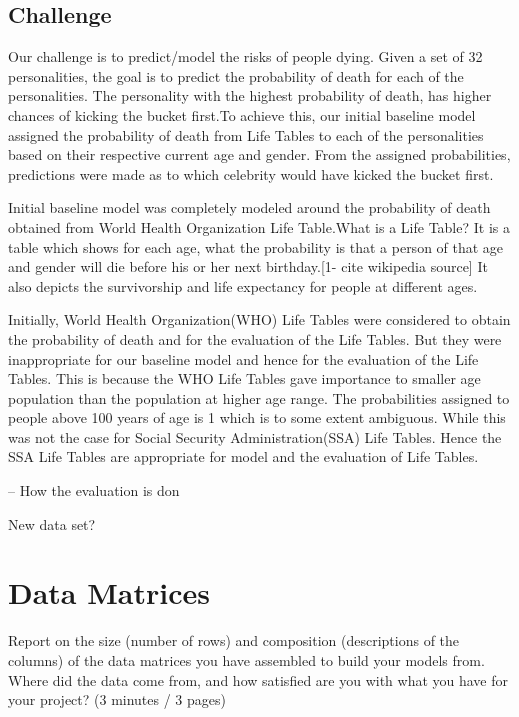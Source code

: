 \documentclass[runningheads]{llncs}
\begin{document}
\subsection{Challenge}

Our challenge is to predict/model the risks of people dying. Given a set of 32 personalities, the goal is to predict the probability of death for each of the personalities. The personality with the highest probability of death, has higher chances of kicking the bucket first.To achieve this, our initial baseline model assigned the probability of death from Life Tables to each of the personalities based on their respective current age and gender. From the assigned probabilities, predictions were made as to which celebrity would have kicked the bucket first.

Initial baseline model was completely modeled around the probability of death obtained from World Health Organization Life Table.What is a Life Table? It is a table which shows for each age, what the probability is that a person of that age and gender will die before his or her next birthday.[1- cite wikipedia source] It also depicts the survivorship and life expectancy for people at different ages.


Initially, World Health Organization(WHO) Life Tables were considered to obtain the probability of death and for the evaluation of the Life Tables. But they were inappropriate for our baseline model and hence for the evaluation of the Life Tables. This is because the WHO Life Tables gave importance to smaller age population than the population at higher age range. The probabilities assigned to people above 100 years of age is 1 which is to some extent ambiguous. While this was not the case for Social Security Administration(SSA) Life Tables. Hence the SSA Life Tables are appropriate for model and the evaluation of Life Tables.

-- How the evaluation is don

New data set?


\section{Data Matrices}

Report on the size (number of rows) and composition (descriptions of the columns) of the data matrices you have assembled to build your models from.  Where did the data come from, and how satisfied are you with what you have for your project? 
(3 minutes / 3 pages)
\end{document}

